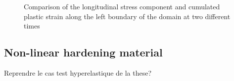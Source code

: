 \begin{figure}[ht]
  \centering
  
  \caption{Comparison of the longitudinal stress component and cumulated plastic strain along the left boundary of the domain at two different times}
  \label{fig:left_line}
\end{figure}

\subsection{Non-linear hardening material}
\label{sec:non-linear-hardening}
Reprendre le cas test hyperelastique de la these?


